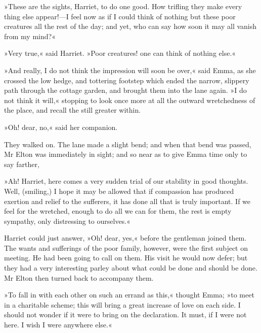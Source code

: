 »These are the sights, Harriet, to do one good. How trifling they make every thing else appear!—I feel now as if I could think of nothing but these poor creatures all the rest of the day; and yet, who can say how soon it may all vanish from my mind?«

»Very true,« said Harriet. »Poor creatures! one can think of nothing else.«

»And really, I do not think the impression will soon be over,« said Emma, as she crossed the low hedge, and tottering footstep which ended the narrow, slippery path through the cottage garden, and brought them into the lane again. »I do not think it will,« stopping to look once more at all the outward wretchedness of the place, and recall the still greater within.

»Oh! dear, no,« said her companion.

They walked on. The lane made a slight bend; and when that bend was passed, Mr Elton was immediately in sight; and so near as to give Emma time only to say farther,

»Ah! Harriet, here comes a very sudden trial of our stability in good thoughts. Well, (smiling,) I hope it may be allowed that if compassion has produced exertion and relief to the sufferers, it has done all that is truly important. If we feel for the wretched, enough to do all we can for them, the rest is empty sympathy, only distressing to ourselves.«

Harriet could just answer, »Oh! dear, yes,« before the gentleman joined them. The wants and sufferings of the poor family, however, were the first subject on meeting. He had been going to call on them. His visit he would now defer; but they had a very interesting parley about what could be done and should be done. Mr Elton then turned back to accompany them.

»To fall in with each other on such an errand as this,« thought Emma; »to meet in a charitable scheme; this will bring a great increase of love on each side. I should not wonder if it were to bring on the declaration. It must, if I were not here. I wish I were anywhere else.«

